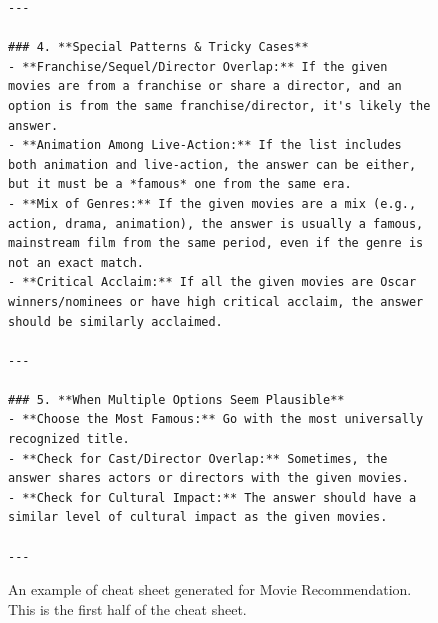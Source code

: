\begin{figure}[t]
\begin{tcolorbox}[title=Cheat Sheet for Movie Recommendation (1/2), colback=gray!10, colframe=black!70, boxrule=0.5pt, top=0pt, bottom=0pt, left=0pt, right=0pt, arc=0.8mm, width=1.0\textwidth]
\begin{lstlisting}
---

### 4. **Special Patterns & Tricky Cases**
- **Franchise/Sequel/Director Overlap:** If the given movies are from a franchise or share a director, and an option is from the same franchise/director, it's likely the answer.
- **Animation Among Live-Action:** If the list includes both animation and live-action, the answer can be either, but it must be a *famous* one from the same era.
- **Mix of Genres:** If the given movies are a mix (e.g., action, drama, animation), the answer is usually a famous, mainstream film from the same period, even if the genre is not an exact match.
- **Critical Acclaim:** If all the given movies are Oscar winners/nominees or have high critical acclaim, the answer should be similarly acclaimed.

---

### 5. **When Multiple Options Seem Plausible**
- **Choose the Most Famous:** Go with the most universally recognized title.
- **Check for Cast/Director Overlap:** Sometimes, the answer shares actors or directors with the given movies.
- **Check for Cultural Impact:** The answer should have a similar level of cultural impact as the given movies.

---
\end{lstlisting}
\end{tcolorbox}
\caption{
An example of cheat sheet generated for Movie Recommendation.
This is the first half of the cheat sheet.
}
\label{fig:cheat_sheet_movie_1}
\end{figure}